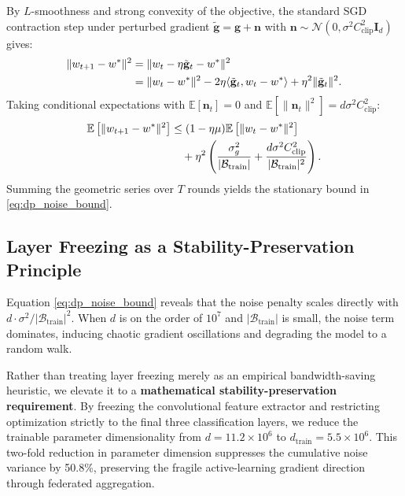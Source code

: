 \documentclass[conference]{IEEEtran}
\begin{document}
\begin{IEEEproof}
By $L$-smoothness and strong convexity of the objective, the standard SGD contraction step under perturbed gradient $\tilde{\mathbf{g}} = \mathbf{g} + \mathbf{n}$ with $\mathbf{n} \sim \mathcal{N}(0, \sigma^2 C_{\mathrm{clip}}^2 \mathbf{I}_d)$ gives:
\begin{align}
\|w_{t+1} - w^*\|^2 &= \|w_t - \eta \tilde{\mathbf{g}}_t - w^*\|^2 \notag \\
&= \|w_t - w^*\|^2 - 2\eta \langle \tilde{\mathbf{g}}_t, w_t - w^* \rangle + \eta^2 \|\tilde{\mathbf{g}}_t\|^2.
\end{align}
Taking conditional expectations with $\mathbb{E}[\mathbf{n}_t] = 0$ and $\mathbb{E}[\|\mathbf{n}_t\|^2] = d \sigma^2 C_{\mathrm{clip}}^2$:
\begin{align}
\mathbb{E}\left[\|w_{t+1} - w^*\|^2\right] &\le (1 - \eta \mu) \mathbb{E}\left[\|w_t - w^*\|^2\right] \notag \\
&\quad + \eta^2 \left( \frac{\sigma_g^2}{|\mathcal{B}_{\mathrm{train}}|} + \frac{d \sigma^2 C_{\mathrm{clip}}^2}{|\mathcal{B}_{\mathrm{train}}|^2} \right).
\end{align}
Summing the geometric series over $T$ rounds yields the stationary bound in \eqref{eq:dp_noise_bound}.
\end{IEEEproof}

\subsection{Layer Freezing as a Stability-Preservation Principle}
Equation \eqref{eq:dp_noise_bound} reveals that the noise penalty scales directly with $d \cdot \sigma^2 / |\mathcal{B}_{\mathrm{train}}|^2$. When $d$ is on the order of $10^7$ and $|\mathcal{B}_{\mathrm{train}}|$ is small, the noise term dominates, inducing chaotic gradient oscillations and degrading the model to a random walk.

Rather than treating layer freezing merely as an empirical bandwidth-saving heuristic, we elevate it to a \textbf{mathematical stability-preservation requirement}. By freezing the convolutional feature extractor and restricting optimization strictly to the final three classification layers, we reduce the trainable parameter dimensionality from $d = 11.2 \times 10^6$ to $d_{\mathrm{train}} = 5.5 \times 10^6$. This two-fold reduction in parameter dimension suppresses the cumulative noise variance by 50.8\%, preserving the fragile active-learning gradient direction through federated aggregation.
\end{document}
